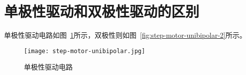 
\section{单极性驱动和双极性驱动的区别}





单极性驱动电路如图~\ref{fig:step-motor-unibipolar}所示，双极性则如图~\ref{fig:step-motor-unibipolar-2}所示。

\begin{figure}[htbp]
    \centering
    \texttt{[image: step-motor-unibipolar.jpg]}
    \caption{单极性驱动电路}
    \label{fig:step-motor-unibipolar}
\end{figure}


